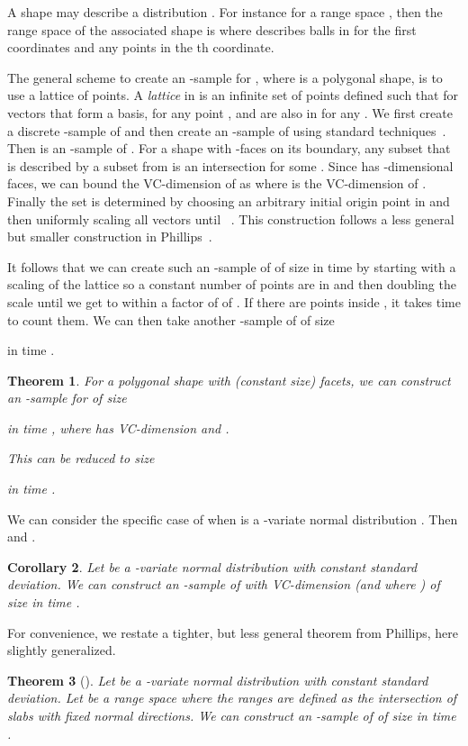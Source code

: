 \documentclass{journal}
\newtheorem {theorem}{Theorem}[section]
\newtheorem {corollary}[theorem]{Corollary}
\begin{document}
A shape  may describe a distribution .
For instance for a range space , then the range space of the associated shape  is  where  describes balls in  for the first  coordinates and any points in the th coordinate.

The general scheme to create an -sample for , where  is a polygonal shape, is to use a lattice  of points.
A \emph{lattice}  in  is an infinite set of points defined such that for  vectors  that form a basis, for any point ,  and  are also in  for any .
We first create a discrete -sample  of   and then create an -sample  of  using standard techniques~\cite{CM96,Phi08}.  Then  is an -sample of .
For a shape  with  -faces on its boundary, any subset  that is described by a subset from  is an intersection  for some .  Since  has  -dimensional faces, we can bound the VC-dimension of  as  where  is the VC-dimension of .
Finally the set  is determined by choosing an arbitrary initial origin point in  and then uniformly scaling all vectors  until ~\cite{Mat99}.  This construction follows a less general but smaller construction in Phillips~\cite{Phi08}.

It follows that we can create such an -sample  of  of size  in time  by starting with a scaling of the lattice so a constant number of points are in  and then doubling the scale until we get to within a factor of  of .  If there are  points inside , it takes  time to count them.  We can then take another -sample of  of size

 in time
 .

\begin{theorem}
For a polygonal shape  with  (constant size) facets, we can construct an -sample for  of size

in time
,
where  has VC-dimension  and
.

This can be reduced to size

in time
.
\label{lem:mu-eps}
\end{theorem}

We can consider the specific case of when  is a -variate normal distribution .  Then  and .

\begin{corollary}
Let  be a -variate normal distribution with constant standard deviation.
We can construct an -sample of  with VC-dimension  (and where ) of size  in time
.
\label{cor:norm-es}
\end{corollary}

For convenience, we restate a tighter, but less general theorem from Phillips, here slightly generalized.
\begin{theorem}[\cite{Phi08,Phi09}]
Let  be a -variate normal distribution with constant standard deviation.
Let  be a range space where the ranges are defined as the intersection of  slabs with fixed normal directions.
We can construct an -sample of  of size  in time .
\label{thm:Phi08}
\end{theorem}
\end{document}
